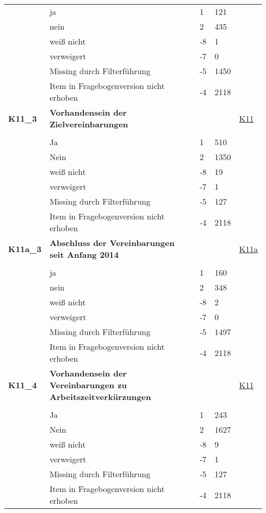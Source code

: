 \begin{longtable}{| L{2.5cm} | L{8.25cm}| C{1.5cm} | R{1.25cm} | C{2.25cm} |  }
   & ja & 1 & 121 &  \\ 
   & nein & 2 & 435 &  \\ 
   & weiß nicht & -8 & 1 &  \\ 
   & verweigert & -7 & 0 &  \\ 
   & Missing durch Filterführung & -5 & 1450 &  \\ 
   & Item in Fragebogenversion nicht erhoben & -4 & 2118 &  \\ 
   \midrule
\textbf{K11\_3}\label{var:suf:K11:3} & \textbf{Vorhandensein der Zielvereinbarungen} &  &  & \hyperref[K11]{K11} \\ 
   &  &  &  &  \\ 
   & Ja & 1 & 510 &  \\ 
   & Nein & 2 & 1350 &  \\ 
   & weiß nicht & -8 & 19 &  \\ 
   & verweigert & -7 & 1 &  \\ 
   & Missing durch Filterführung & -5 & 127 &  \\ 
   & Item in Fragebogenversion nicht erhoben & -4 & 2118 &  \\ 
   \midrule
\textbf{K11a\_3}\label{var:suf:K11a:3} & \textbf{Abschluss der Vereinbarungen seit Anfang 2014} &  &  & \hyperref[K11a]{K11a} \\ 
   &  &  &  &  \\ 
   & ja & 1 & 160 &  \\ 
   & nein & 2 & 348 &  \\ 
   & weiß nicht & -8 & 2 &  \\ 
   & verweigert & -7 & 0 &  \\ 
   & Missing durch Filterführung & -5 & 1497 &  \\ 
   & Item in Fragebogenversion nicht erhoben & -4 & 2118 &  \\ 
   \midrule
\textbf{K11\_4}\label{var:suf:K11:4} & \textbf{Vorhandensein der Vereinbarungen zu Arbeitszeitverkürzungen} &  &  & \hyperref[K11]{K11} \\ 
   &  &  &  &  \\ 
   & Ja & 1 & 243 &  \\ 
   & Nein & 2 & 1627 &  \\ 
   & weiß nicht & -8 & 9 &  \\ 
   & verweigert & -7 & 1 &  \\ 
   & Missing durch Filterführung & -5 & 127 &  \\ 
   & Item in Fragebogenversion nicht erhoben & -4 & 2118 &  \\ 

\end{longtable}
